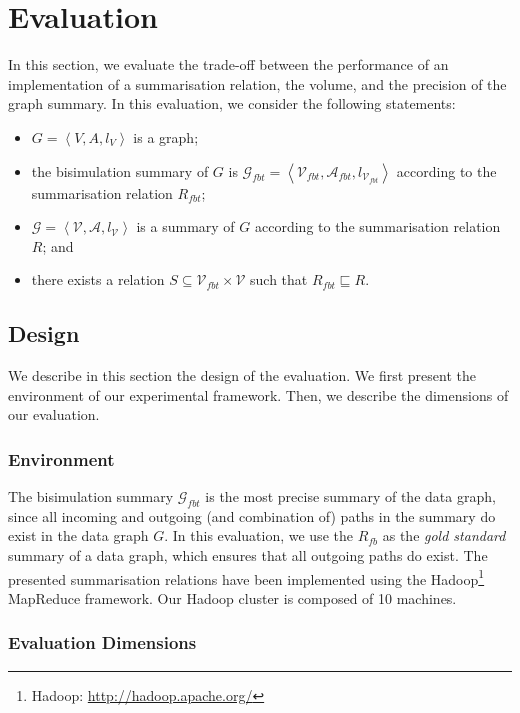 \section{Evaluation}
\label{sec:eval}

In this section, we evaluate the trade-off between the performance of an implementation of a summarisation relation, the volume, and the precision of the graph summary.
In this evaluation, we consider the following statements:
\begin{itemize}
	\item $G=\left\langle V, A, l_V \right\rangle$ is a graph;
	\item the bisimulation summary of $G$ is $\mathcal{G}_{fbt} = \left\langle \mathcal{V}_{fbt}, \mathcal{A}_{fbt}, l_{\mathcal{V}_{fbt}} \right\rangle$ according to the summarisation relation $R_{fbt}$;
	\item $\mathcal{G} = \left\langle \mathcal{V}, \mathcal{A}, l_{\mathcal{V}} \right\rangle$ is a summary of $G$ according to the summarisation relation $R$; and
	\item there exists a relation $S \subseteq \mathcal{V}_{fbt} \times \mathcal{V}$ such that $R_{fbt} \sqsubseteq R$.
\end{itemize}

\subsection{Design}
\label{sec:eval:design}

We describe in this section the design of the evaluation. We first present the environment of our experimental framework. Then, we describe the dimensions of our evaluation.

\subsubsection{Environment}

The bisimulation summary $\mathcal{G}_{fbt}$ is the most precise summary of the data graph, since all incoming and outgoing (and combination of) paths in the summary do exist in the data graph $G$. In this evaluation, we use the $R_{fb}$ as the \emph{gold standard} summary of a data graph, which ensures that all outgoing paths do exist. The presented summarisation relations have been implemented using the Hadoop\footnote{Hadoop: \url{http://hadoop.apache.org/}} MapReduce framework. Our Hadoop cluster is composed of 10 machines.

\subsubsection{Evaluation Dimensions}


